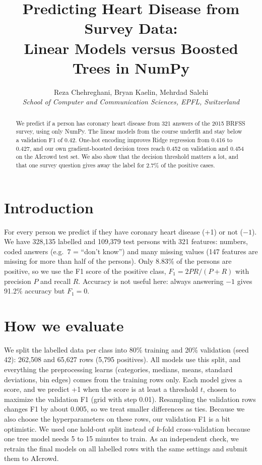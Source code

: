 \documentclass[10pt,conference,compsocconf]{IEEEtran}
\begin{document}
\title{Predicting Heart Disease from Survey Data:\\
Linear Models versus Boosted Trees in NumPy}

\author{
  Reza Chehreghani, Bryan Kaelin, Mehrdad Salehi\\
  \textit{School of Computer and Communication Sciences, EPFL, Switzerland}
}

\maketitle

\begin{abstract}
We predict if a person has coronary heart disease from 321 answers of the
2015 BRFSS survey, using only NumPy. The linear models from the course
underfit and stay below a validation F1 of 0.42. One-hot encoding improves
Ridge regression from 0.416 to 0.427, and our own gradient-boosted decision
trees reach 0.452 on validation and 0.454 on the AIcrowd test set. We also
show that the decision threshold matters a lot, and that one survey question
gives away the label for 2.7\% of the positive cases.
\end{abstract}

\section{Introduction}
For every person we predict if they have coronary heart disease (+1) or not
($-1$). We have 328{,}135 labelled and 109{,}379 test persons with 321
features: numbers, coded answers (e.g.\ 7 = ``don't know'') and many missing
values (147 features are missing for more than half of the persons). Only
8.83\% of the persons are positive, so we use the F1 score of the positive
class, $F_1 = 2PR/(P+R)$ with precision $P$ and recall $R$. Accuracy is not
useful here: always answering $-1$ gives 91.2\% accuracy but $F_1=0$.

\section{How we evaluate}
We split the labelled data per class into 80\% training and 20\% validation
(seed 42): 262{,}508 and 65{,}627 rows (5{,}795 positives). All models use
this split, and everything the preprocessing learns (categories, medians,
means, standard deviations, bin edges) comes from the training rows only.
Each model gives a score, and we predict +1 when the score is at least a
threshold $t$, chosen to maximize the validation F1 (grid with step 0.01).
Resampling the validation rows changes F1 by about 0.005, so we treat smaller
differences as ties. Because we also choose the hyperparameters on these
rows, our validation F1 is a bit optimistic. We used one hold-out split
instead of $k$-fold cross-validation because one tree model needs 5 to 15
minutes to train. As an independent check, we retrain the final models on all
labelled rows with the same settings and submit them to AIcrowd.
\end{document}

